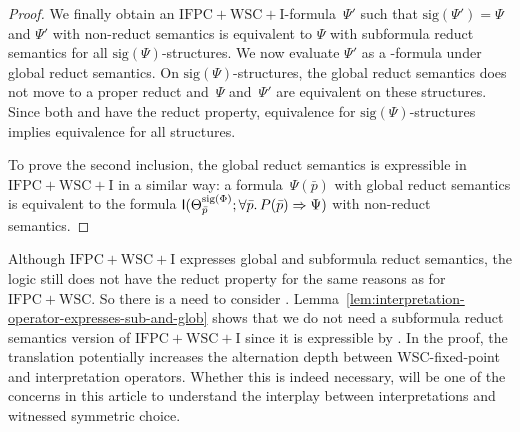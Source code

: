 \documentclass[]{lmcs}
\newcommand{\qspace}{\mathchoice{\;}{\,}{}{}}
\newcommand{\formA}{\Phi}
\newcommand{\formB}{\Psi}
\newcommand{\interpret}{\Theta}
\newcommand{\tup}[1]{\bar{#1}}
\newcommand{\sigOf}[1]{\mathrm{sig}(#1)}
\newcommand{\IFPCWSC}{\ensuremath{\mathrm{IFPC{+}WSC}}}
\newcommand{\IFPCWSCI}{\ensuremath{\mathrm{IFPC{+}WSC{+}I}}}
\newcommand{\iop}[2]{\mathsf{I}(#1;#2)}
\begin{document}
\begin{proof}
	We finally obtain an \IFPCWSCI{}-formula~$\formB'$
	such that $\sigOf{\formB'} = \formB$
	and $\formB'$ with non-reduct semantics is equivalent to $\formB$ with subformula reduct semantics for all $\sigOf{\formB}$-structures.
	We now evaluate $\formB'$ as a \IFPCWSCIglob{}-formula under global reduct semantics.
	On $\sigOf{\formB}$-structures,
	the global reduct semantics does not move to a proper reduct
	and~$\formB$ and~$\formB'$ are equivalent on these structures.
	Since both \IFPCWSCIglob{} and \IFPCWSCsub{} have the reduct property,
	equivalence for  $\sigOf{\formB}$-structures implies equivalence for all structures.

	To prove the second inclusion, the global reduct semantics is expressible
	in $\IFPCWSCI$ in a similar way: a formula~$\formB(\tup{p})$ with global reduct semantics
	is equivalent to the formula $\iop{\interpret^{\sigOf{\formA}}_{\tup{p}}}{\forall \tup{p}.\qspace P(\tup{p}) \Rightarrow \formB}$ with non-reduct semantics.
\end{proof}
Although \IFPCWSCI{} expresses global and subformula reduct semantics,
the logic still does not have the reduct property for the same reasons as for \IFPCWSC{}.
So there is a need to consider \IFPCWSCIglob{}.
Lemma~\ref{lem:interpretation-operator-expresses-sub-and-glob} shows that we do not need a subformula reduct semantics version
of \IFPCWSCI{}
since it is expressible by \IFPCWSCIglob{}.
In the proof, the translation potentially increases
the alternation depth between WSC-fixed-point and interpretation operators.
Whether this is indeed necessary, will be one of the concerns in this article
to understand the interplay between interpretations and witnessed symmetric choice.
\end{document}
